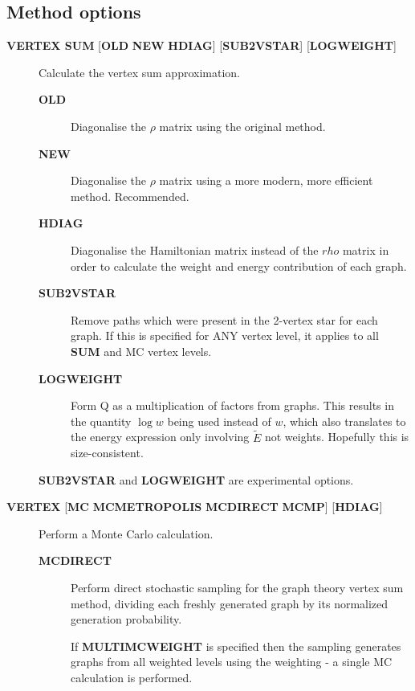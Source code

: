 \documentclass[openany,a4paper,10pt]{manual}
\begin{document}
\subsection{Method options}
\begin{description}
\item[\textbf{VERTEX SUM} {[}\textbf{OLD} \textbf{NEW} \textbf{HDIAG}{]} {[}\textbf{SUB2VSTAR}{]} {[}\textbf{LOGWEIGHT}{]}]
Calculate the vertex sum approximation.
\begin{description}
\item[\textbf{OLD}]
Diagonalise the $\rho$ matrix using the original method.

\item[\textbf{NEW}]
Diagonalise the $\rho$ matrix using a more modern, more
efficient method.  Recommended.

\item[\textbf{HDIAG}]
Diagonalise the Hamiltonian matrix instead of the $rho$ matrix
in order to calculate the weight and energy contribution of each graph.

\item[\textbf{SUB2VSTAR}]
Remove paths which were present in the 2-vertex
star for each graph.  If this is specified for ANY vertex level,
it applies to all \textbf{SUM} and MC vertex levels.

\item[\textbf{LOGWEIGHT}]
Form Q as a multiplication of factors from graphs.  This results
in the quantity $\operatorname{log} w$ being used instead
of $w$, which also translates to the energy expression
only involving $\tilde{E}$ not weights.  Hopefully this
is size-consistent.

\end{description}

\begin{notice}[warning]
\textbf{SUB2VSTAR} and \textbf{LOGWEIGHT} are experimental options.
\end{notice}

\item[\textbf{VERTEX} {[}\textbf{MC} \textbf{MCMETROPOLIS} \textbf{MCDIRECT} \textbf{MCMP}{]} {[}\textbf{HDIAG}{]}]
Perform a Monte Carlo calculation.
\begin{description}
\item[\textbf{MCDIRECT}]
Perform direct stochastic sampling for the graph theory vertex sum
method, dividing each freshly generated graph by its normalized
generation probability.

If \textbf{MULTIMCWEIGHT} is specified then
the sampling generates graphs from all weighted levels using
the weighting - a single MC calculation is performed.


\end{description}
\end{description}
\end{document}
